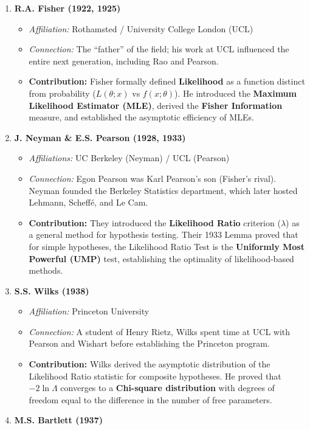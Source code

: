 \documentclass[
  letterpaper,
  DIV=11,
  numbers=noendperiod]{scrreprt}
\providecommand{\tightlist}{%
  \setlength{\itemsep}{0pt}\setlength{\parskip}{0pt}}
\renewcommand{\[}{\begin{equation}}
\renewcommand{\]}{\end{equation}}
\theoremstyle{definition}
\theoremstyle{plain}
\theoremstyle{plain}
\theoremstyle{plain}
\theoremstyle{definition}
\theoremstyle{plain}
\theoremstyle{remark}
\begin{document}
\begin{enumerate}
\def\labelenumi{\arabic{enumi}.}
\tightlist
\item
  \textbf{R.A. Fisher (1922, 1925)}

  \begin{itemize}
  \tightlist
  \item
    \emph{Affiliation:} Rothamsted / University College London (UCL)
  \item
    \emph{Connection:} The ``father'' of the field; his work at UCL
    influenced the entire next generation, including Rao and Pearson.
  \item
    \textbf{Contribution:} Fisher formally defined \textbf{Likelihood}
    as a function distinct from probability (\(L(\theta; x)\) vs
    \(f(x; \theta)\)). He introduced the \textbf{Maximum Likelihood
    Estimator (MLE)}, derived the \textbf{Fisher Information} measure,
    and established the asymptotic efficiency of MLEs.
  \end{itemize}
\item
  \textbf{J. Neyman \& E.S. Pearson (1928, 1933)}

  \begin{itemize}
  \tightlist
  \item
    \emph{Affiliations:} UC Berkeley (Neyman) / UCL (Pearson)
  \item
    \emph{Connection:} Egon Pearson was Karl Pearson's son (Fisher's
    rival). Neyman founded the Berkeley Statistics department, which
    later hosted Lehmann, Scheffé, and Le Cam.
  \item
    \textbf{Contribution:} They introduced the \textbf{Likelihood Ratio}
    criterion (\(\lambda\)) as a general method for hypothesis testing.
    Their 1933 Lemma proved that for simple hypotheses, the Likelihood
    Ratio Test is the \textbf{Uniformly Most Powerful (UMP)} test,
    establishing the optimality of likelihood-based methods.
  \end{itemize}
\item
  \textbf{S.S. Wilks (1938)}

  \begin{itemize}
  \tightlist
  \item
    \emph{Affiliation:} Princeton University
  \item
    \emph{Connection:} A student of Henry Rietz, Wilks spent time at UCL
    with Pearson and Wishart before establishing the Princeton program.
  \item
    \textbf{Contribution:} Wilks derived the asymptotic distribution of
    the Likelihood Ratio statistic for composite hypotheses. He proved
    that \(-2 \ln \Lambda\) converges to a \textbf{Chi-square
    distribution} with degrees of freedom equal to the difference in the
    number of free parameters.
  \end{itemize}
\item
  \textbf{M.S. Bartlett (1937)}


\end{enumerate}
\end{document}
